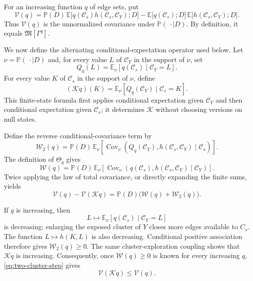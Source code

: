 \documentclass[11pt]{article}
\theoremstyle{definition}
\theoremstyle{remark}
\newcommand{\PP}{\mathbb P}
\newcommand{\EE}{\mathbb E}
\newcommand{\eC}{\mathcal C}
\DeclareMathOperator{\Cov}{Cov}
\newcommand{\Marg}{\mathfrak M}
\begin{document}
For an increasing function $q$ of edge sets, put
\[
 \mathcal V(q)=\PP(D)\,
   \EE\bigl[q(\eC_s)h(\eC_s,\eC_Y);D\bigr]
 -\EE\bigl[q(\eC_s);D\bigr]\,
  \EE\bigl[h(\eC_s,\eC_Y);D\bigr].
\]
Thus $\mathcal V(q)$ is the unnormalized covariance under $\PP(\,\cdot\mid D)$. By
definition, it equals $\Marg[\Gamma^q]$.

We now define the alternating conditional-expectation operator used below. Let
$\nu=\PP(\,\cdot\mid D)$ and, for every value $L$ of $\eC_Y$ in the support of $\nu$, set
\[
 Q_q(L)=\EE_\nu[q(\eC_s)\mid\eC_Y=L].
\]
For every value $K$ of $\eC_s$ in the support of $\nu$, define
\begin{equation}\label{eq:gibbs-operator}
 (\mathcal Kq)(K)=\EE_\nu[Q_q(\eC_Y)\mid\eC_s=K].
\end{equation}
This finite-state formula first applies conditional expectation given $\eC_Y$ and then
conditional expectation given $\eC_s$; it determines $\mathcal K$ without choosing
versions on null states.

Define the reverse conditional-covariance term by
\[
 \mathcal W_2(q)=\PP(D)\,
 \EE_\nu\!\left[
 \Cov_\nu\!\left(Q_q(\eC_Y),h(\eC_s,\eC_Y)\mid\eC_s\right)\right].
\]
The definition of $\Theta_q$ gives
\[
 \mathcal W(q)=\PP(D)\,
 \EE_\nu\!\left[
 \Cov_\nu\!\left(q(\eC_s),h(\eC_s,\eC_Y)\mid\eC_Y\right)\right].
\]
Twice applying the law of total covariance, or directly expanding the finite sums, yields
\begin{equation}\label{eq:two-cluster-step}
 \mathcal V(q)-\mathcal V(\mathcal Kq)
 =\PP(D)\bigl(\mathcal W(q)+\mathcal W_2(q)\bigr).
\end{equation}

If $q$ is increasing, then
\[
 L\longmapsto\EE_\nu[q(\eC_s)\mid\eC_Y=L]
\]
is decreasing: enlarging the exposed cluster of $Y$ closes more edges available to
$C_s$. The function $L\mapsto h(K,L)$ is also decreasing. Conditional positive
association therefore gives $\mathcal W_2(q)\geq0$. The same cluster-exploration coupling
shows that $\mathcal Kq$ is increasing. Consequently, once $\mathcal W(q)\geq0$ is known
for every increasing $q$, \eqref{eq:two-cluster-step} gives
\[
 \mathcal V(\mathcal Kq)\leq\mathcal V(q).
\]
\end{document}
